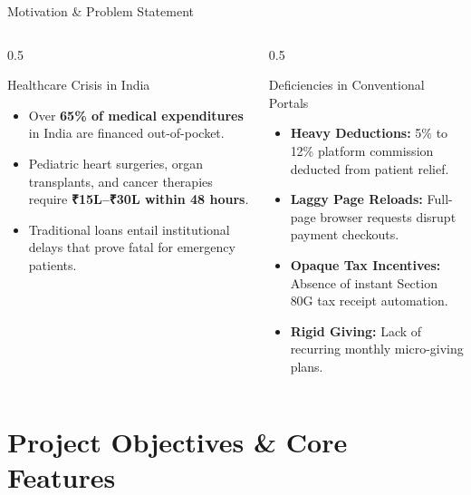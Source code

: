 \documentclass[aspectratio=169, 10pt]{beamer}
\begin{document}
\begin{frame}{Motivation \& Problem Statement}
  \begin{columns}[T]
    \begin{column}{0.5\textwidth}
      \begin{block}{Healthcare Crisis in India}
        \begin{itemize}
          \item Over \textbf{65\% of medical expenditures} in India are financed out-of-pocket.
          \item Pediatric heart surgeries, organ transplants, and cancer therapies require \textbf{₹15L--₹30L within 48 hours}.
          \item Traditional loans entail institutional delays that prove fatal for emergency patients.
        \end{itemize}
      \end{block}
    \end{column}
    \begin{column}{0.5\textwidth}
      \begin{alertblock}{Deficiencies in Conventional Portals}
        \begin{itemize}
          \item \textbf{Heavy Deductions:} 5\% to 12\% platform commission deducted from patient relief.
          \item \textbf{Laggy Page Reloads:} Full-page browser requests disrupt payment checkouts.
          \item \textbf{Opaque Tax Incentives:} Absence of instant Section 80G tax receipt automation.
          \item \textbf{Rigid Giving:} Lack of recurring monthly micro-giving plans.
        \end{itemize}
      \end{alertblock}
    \end{column}
  \end{columns}
\end{frame}

\section{Project Objectives \& Core Features}
\end{document}
